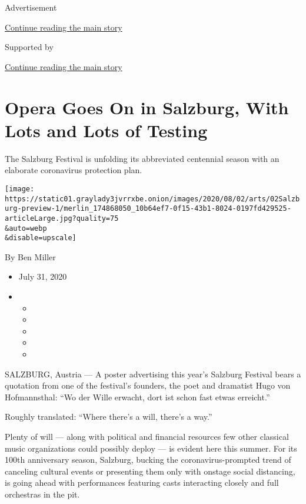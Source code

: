 Advertisement

\protect\hyperlink{after-top}{Continue reading the main story}

Supported by

\protect\hyperlink{after-sponsor}{Continue reading the main story}

\hypertarget{opera-goes-on-in-salzburg-with-lots-and-lots-of-testing}{%
\section{Opera Goes On in Salzburg, With Lots and Lots of
Testing}\label{opera-goes-on-in-salzburg-with-lots-and-lots-of-testing}}

The Salzburg Festival is unfolding its abbreviated centennial season
with an elaborate coronavirus protection plan.

\texttt{[image: https://static01.graylady3jvrrxbe.onion/images/2020/08/02/arts/02Salzburg-preview-1/merlin\_174868050\_10b64ef7-0f15-43b1-8024-0197fd429525-articleLarge.jpg?quality=75\\\&auto=webp\\\&disable=upscale]}

By Ben Miller

\begin{itemize}
\item
  July 31, 2020
\item
  \begin{itemize}
  \item
  \item
  \item
  \item
  \item
  \end{itemize}
\end{itemize}

SALZBURG, Austria --- A poster advertising this year's Salzburg Festival
bears a quotation from one of the festival's founders, the poet and
dramatist Hugo von Hofmannsthal: ``Wo der Wille erwacht, dort ist schon
fast etwas erreicht.''

Roughly translated: ``Where there's a will, there's a way.''

Plenty of will --- along with political and financial resources few
other classical music organizations could possibly deploy --- is evident
here this summer. For its 100th anniversary season, Salzburg, bucking
the coronavirus-prompted trend of canceling cultural events or
presenting them only with onstage social distancing, is going ahead with
performances featuring casts interacting closely and full orchestras in
the pit.

